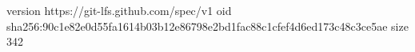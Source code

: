version https://git-lfs.github.com/spec/v1
oid sha256:90c1e82e0d55fa1614b03b12e86798e2bd1fac88c1cfef4d6ed173c48c3ce5ae
size 342
